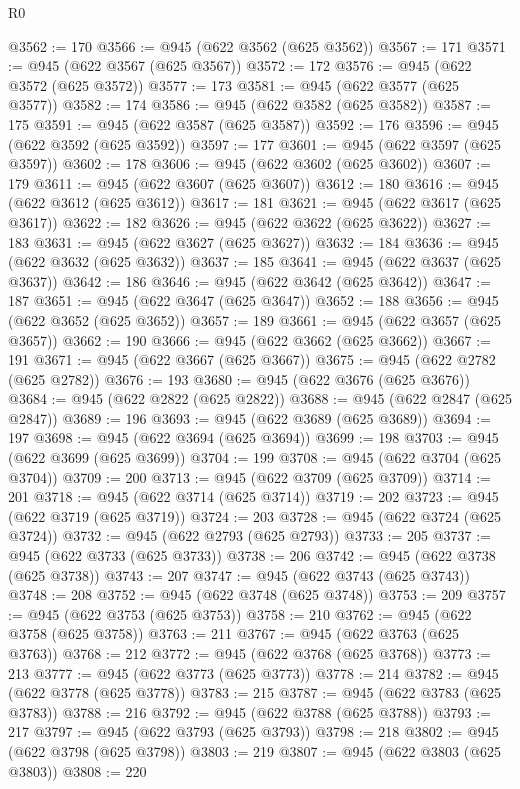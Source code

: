 \begin{lexlean}{R0}
\begin{coremodule}
@3562 := 170
@3566 := @945 (@622 @3562 (@625 @3562))
@3567 := 171
@3571 := @945 (@622 @3567 (@625 @3567))
@3572 := 172
@3576 := @945 (@622 @3572 (@625 @3572))
@3577 := 173
@3581 := @945 (@622 @3577 (@625 @3577))
@3582 := 174
@3586 := @945 (@622 @3582 (@625 @3582))
@3587 := 175
@3591 := @945 (@622 @3587 (@625 @3587))
@3592 := 176
@3596 := @945 (@622 @3592 (@625 @3592))
@3597 := 177
@3601 := @945 (@622 @3597 (@625 @3597))
@3602 := 178
@3606 := @945 (@622 @3602 (@625 @3602))
@3607 := 179
@3611 := @945 (@622 @3607 (@625 @3607))
@3612 := 180
@3616 := @945 (@622 @3612 (@625 @3612))
@3617 := 181
@3621 := @945 (@622 @3617 (@625 @3617))
@3622 := 182
@3626 := @945 (@622 @3622 (@625 @3622))
@3627 := 183
@3631 := @945 (@622 @3627 (@625 @3627))
@3632 := 184
@3636 := @945 (@622 @3632 (@625 @3632))
@3637 := 185
@3641 := @945 (@622 @3637 (@625 @3637))
@3642 := 186
@3646 := @945 (@622 @3642 (@625 @3642))
@3647 := 187
@3651 := @945 (@622 @3647 (@625 @3647))
@3652 := 188
@3656 := @945 (@622 @3652 (@625 @3652))
@3657 := 189
@3661 := @945 (@622 @3657 (@625 @3657))
@3662 := 190
@3666 := @945 (@622 @3662 (@625 @3662))
@3667 := 191
@3671 := @945 (@622 @3667 (@625 @3667))
@3675 := @945 (@622 @2782 (@625 @2782))
@3676 := 193
@3680 := @945 (@622 @3676 (@625 @3676))
@3684 := @945 (@622 @2822 (@625 @2822))
@3688 := @945 (@622 @2847 (@625 @2847))
@3689 := 196
@3693 := @945 (@622 @3689 (@625 @3689))
@3694 := 197
@3698 := @945 (@622 @3694 (@625 @3694))
@3699 := 198
@3703 := @945 (@622 @3699 (@625 @3699))
@3704 := 199
@3708 := @945 (@622 @3704 (@625 @3704))
@3709 := 200
@3713 := @945 (@622 @3709 (@625 @3709))
@3714 := 201
@3718 := @945 (@622 @3714 (@625 @3714))
@3719 := 202
@3723 := @945 (@622 @3719 (@625 @3719))
@3724 := 203
@3728 := @945 (@622 @3724 (@625 @3724))
@3732 := @945 (@622 @2793 (@625 @2793))
@3733 := 205
@3737 := @945 (@622 @3733 (@625 @3733))
@3738 := 206
@3742 := @945 (@622 @3738 (@625 @3738))
@3743 := 207
@3747 := @945 (@622 @3743 (@625 @3743))
@3748 := 208
@3752 := @945 (@622 @3748 (@625 @3748))
@3753 := 209
@3757 := @945 (@622 @3753 (@625 @3753))
@3758 := 210
@3762 := @945 (@622 @3758 (@625 @3758))
@3763 := 211
@3767 := @945 (@622 @3763 (@625 @3763))
@3768 := 212
@3772 := @945 (@622 @3768 (@625 @3768))
@3773 := 213
@3777 := @945 (@622 @3773 (@625 @3773))
@3778 := 214
@3782 := @945 (@622 @3778 (@625 @3778))
@3783 := 215
@3787 := @945 (@622 @3783 (@625 @3783))
@3788 := 216
@3792 := @945 (@622 @3788 (@625 @3788))
@3793 := 217
@3797 := @945 (@622 @3793 (@625 @3793))
@3798 := 218
@3802 := @945 (@622 @3798 (@625 @3798))
@3803 := 219
@3807 := @945 (@622 @3803 (@625 @3803))
@3808 := 220

\end{coremodule}
\end{lexlean}
